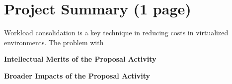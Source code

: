 \section*{Project Summary {\small (1 page)}}
%
Workload consolidation is a key technique in reducing costs in virtualized environments. 
The problem with 

{\bf Intellectual Merits of the Proposal Activity} 


{\bf Broader Impacts of the Proposal Activity} 


